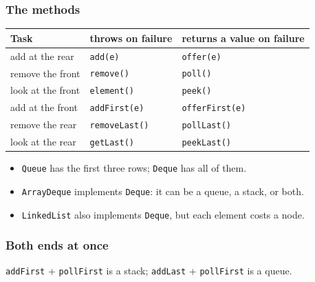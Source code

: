 \documentclass[aspectratio=169,10pt,compress]{beamer}
\begin{document}




\begin{frame}[t,fragile] \frametitle{The methods}
  \begin{center}\footnotesize
  \begin{tabular}{@{}lll@{}}
    \toprule
    \textbf{Task} & \textbf{throws on failure} & \textbf{returns a value on failure} \\
    \midrule
    add at the rear   & \texttt{add(e)}      & \texttt{offer(e)} \\
    remove the front  & \texttt{remove()}    & \texttt{poll()} \\
    look at the front & \texttt{element()}   & \texttt{peek()} \\
    \midrule
    add at the front  & \texttt{addFirst(e)} & \texttt{offerFirst(e)} \\
    remove the rear   & \texttt{removeLast()} & \texttt{pollLast()} \\
    look at the rear  & \texttt{getLast()}   & \texttt{peekLast()} \\
    \bottomrule
  \end{tabular}
  \end{center}
  \vspace{0.4em}
  \begin{itemize}\small
    \item \texttt{Queue} has the first three rows; \texttt{Deque} has all of them.
    \item \texttt{ArrayDeque} implements \texttt{Deque}: it can be a queue, a stack, or both.
    \item \texttt{LinkedList} also implements \texttt{Deque}, but each element costs a node.
  \end{itemize}
\end{frame}




\begin{frame}[t,fragile] \frametitle{Both ends at once}
  \small \texttt{addFirst} + \texttt{pollFirst} is a stack; \texttt{addLast} + \texttt{pollFirst} is a queue.
\end{frame}
\end{document}
